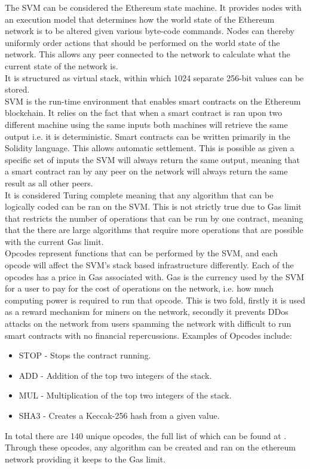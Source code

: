 The SVM can be considered the Ethereum state machine. It provides nodes with an execution model that determines how the world state of the Ethereum network is to be altered given various byte-code commands.  Nodes can thereby uniformly order actions that should be performed on the world state of the network. This allows any peer connected to the network to calculate what the current state of the network is. \\

It is structured as virtual stack, within which 1024 separate 256-bit values can be stored. \\  

SVM is the run-time environment that enables smart contracts on the Ethereum blockchain. It relies on the fact that when a smart contract is ran upon two different machine using the same inputs both machines will retrieve the same output i.e. it is deterministic. Smart contracts can be written primarily in the Solidity language. This allows automatic settlement. This is possible as given a specific set of inputs the SVM will always return the same output, meaning that a smart contract ran by any peer on the network will always return the same result as all other peers. \\

It is considered Turing complete meaning that any algorithm that can be logically coded can be ran on the SVM. This is not strictly true due to Gas limit that restricts the number of operations that can be run by one contract, meaning that the there are large algorithms that require more operations that are possible with the current Gas limit.  \\
 

Opcodes represent functions that can be performed by the SVM, and each opcode will affect the SVM's stack based infrastructure differently. Each of the opcodes has a price in Gas associated with. Gas is the currency used by the SVM for a user to pay for the cost of operations on the network, i.e. how much computing power is required to run that opcode. This is two fold, firstly it is used as a reward mechanism for miners on the network, secondly it prevents DDos attacks on the network from users spamming the network with difficult to run smart contracts with no financial repercussions. Examples of Opcodes include: \\

\begin{itemize}

\item STOP - Stops the contract running.
\item ADD - Addition of the top two integers of the stack.
\item MUL - Multiplication of the top two integers of the stack.
\item SHA3 - Creates a Keccak-256 hash from a given value. \\

\end{itemize} 

In total there are 140 unique opcodes, the full list of which can be found at \cite{Opcodes}. Through these opcodes, any algorithm can be created and ran on the ethereum network providing it keeps to the Gas limit. 